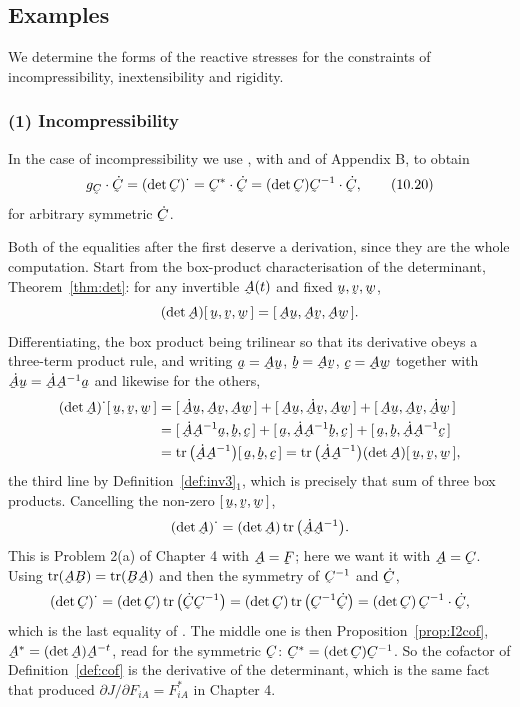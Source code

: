 \subsection*{Examples}

We determine the forms of the reactive stresses for the constraints of
incompressibility, inextensibility and rigidity.

\subsubsection*{(1) Incompressibility}

In the case of incompressibility we use , with  and
 of Appendix B, to obtain
\begin{equation}
   g_{\bC}\cdot\dot\bC=(\det\bC)^{\textstyle\cdot}
   =\bC^{*}\cdot\dot\bC=(\det\bC)\bC^{-1}\cdot\dot\bC ,
   \tag{10.20}\label{eq:10.20}
\end{equation}
for arbitrary symmetric $\dot\bC$.

Both of the equalities after the first deserve a derivation, since they
are the whole computation. Start from the box-product characterisation of
the determinant, Theorem~\ref{thm:det}: for any invertible $\bA(t)$ and
fixed $\bu,\bv,\bw$,
\[
   (\det\bA)\tbox\bu\bv\bw=\tbox{\bA\bu}{\bA\bv}{\bA\bw}.
\]
Differentiating, the box product being trilinear so that its derivative
obeys a three-term product rule, and writing $\ba=\bA\bu$, $\bb=\bA\bv$,
$\bc=\bA\bw$ together with $\dot\bA\bu=\dot\bA\bA^{-1}\ba$ and likewise
for the others,
\[
\begin{aligned}
   (\det\bA)^{\textstyle\cdot}\tbox\bu\bv\bw
   &=\tbox{\dot\bA\bu}{\bA\bv}{\bA\bw}+\tbox{\bA\bu}{\dot\bA\bv}{\bA\bw}
     +\tbox{\bA\bu}{\bA\bv}{\dot\bA\bw}\\
   &=\tbox{\dot\bA\bA^{-1}\ba}\bb\bc+\tbox\ba{\dot\bA\bA^{-1}\bb}\bc
     +\tbox\ba\bb{\dot\bA\bA^{-1}\bc}\\
   &=\tr\big(\dot\bA\bA^{-1}\big)\tbox\ba\bb\bc
    =\tr\big(\dot\bA\bA^{-1}\big)(\det\bA)\tbox\bu\bv\bw ,
\end{aligned}
\]
the third line by Definition~\ref{def:inv3}$_{1}$, which is precisely
that sum of three box products. Cancelling the non-zero
$\tbox\bu\bv\bw$,
\[
   (\det\bA)^{\textstyle\cdot}=(\det\bA)\tr\big(\dot\bA\bA^{-1}\big).
\]
This is Problem 2(a) of Chapter 4 with $\bA=\bF$; here we want it with
$\bA=\bC$. Using $\tr(\bA\bB)=\tr(\bB\bA)$ and then the symmetry of
$\bC^{-1}$ and $\dot\bC$,
\[
   (\det\bC)^{\textstyle\cdot}=(\det\bC)\tr\big(\dot\bC\bC^{-1}\big)
   =(\det\bC)\tr\big(\bC^{-1}\dot\bC\big)
   =(\det\bC)\,\bC^{-1}\cdot\dot\bC ,
\]
which is the last equality of . The middle one is then
Proposition~\ref{prop:I2cof}, $\bA^{*}=(\det\bA)\bA^{-t}$, read for the
symmetric $\bC$: $\bC^{*}=(\det\bC)\bC^{-1}$. So the cofactor of
Definition~\ref{def:cof} is the derivative of the determinant, which is
the same fact that produced $\partial J/\partial F_{iA}=F^{*}_{iA}$ in
Chapter 4.

